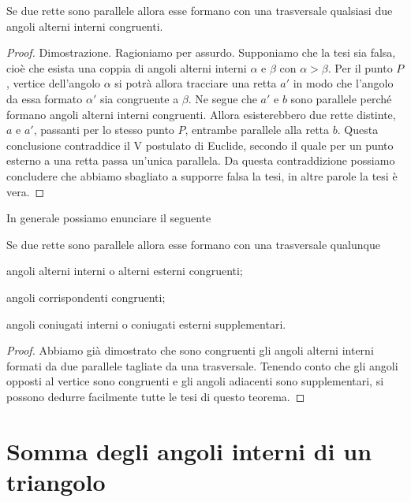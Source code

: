 \begin{teorema}
Se due rette sono parallele allora esse formano con una trasversale qualsiasi due angoli alterni interni congruenti.
\end{teorema}

\begin{proof}
Dimostrazione. Ragioniamo per assurdo. Supponiamo che la tesi sia falsa, cioè che esista una coppia di angoli alterni interni $\alpha$ e $\beta$ con $\alpha>\beta$. Per il punto $P$, vertice dell'angolo $\alpha$ si potrà allora tracciare una retta $a'$ in modo che l'angolo da essa formato $\alpha'$ sia congruente a $\beta$. Ne segue che $a'$ e $b$ sono parallele perché formano angoli alterni interni congruenti. Allora esisterebbero due rette distinte, $a$ e $a'$, passanti per lo stesso punto $P$, entrambe parallele alla retta $b$. Questa conclusione contraddice il V postulato di Euclide, secondo il quale per un punto esterno a una retta passa un'unica parallela. Da questa contraddizione possiamo concludere che abbiamo sbagliato a supporre falsa la tesi, in altre parole la tesi è vera.
\end{proof}

In generale possiamo enunciare il seguente
\begin{teorema}
Se due rette sono parallele allora esse formano con una trasversale qualunque
\begin{itemize*}
\item angoli alterni interni o alterni esterni congruenti;
\item angoli corrispondenti congruenti;
\item angoli coniugati interni o coniugati esterni supplementari.
\end{itemize*}
\end{teorema}

\begin{proof}
Abbiamo già dimostrato che sono congruenti gli angoli alterni interni formati da due parallele tagliate da una trasversale. Tenendo conto che gli angoli opposti al vertice sono congruenti e gli angoli adiacenti sono supplementari, si possono dedurre facilmente tutte le tesi di questo teorema.
\end{proof}


\section{Somma degli angoli interni di un triangolo}

